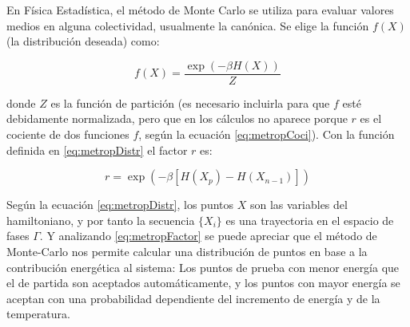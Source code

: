 \documentclass[11pt, a4paper]{article} %
\theoremstyle{named}
\begin{document}
En Física Estadística, el método de Monte Carlo se utiliza para evaluar valores medios en alguna colectividad, usualmente la canónica. Se elige la función $f(X)$ (la distribución deseada) como:

\begin{equation}\label{eq:metropDistr}
f(X) = \frac{\exp(-\beta H(X))}{Z}
\end{equation}

donde $Z$ es la función de partición (es necesario incluirla para que $f$ esté debidamente normalizada, pero que en los cálculos no aparece porque $r$ es el cociente de dos funciones $f$, según la ecuación \eqref{eq:metropCoci}). Con la función definida en \eqref{eq:metropDistr} el factor $r$ es:

\begin{equation}\label{eq:metropFactor}
r = \exp (-\beta [H(X_p) - H(X_{n-1})])
\end{equation}

Según la ecuación \eqref{eq:metropDistr}, los puntos $X$ son las variables del hamiltoniano, y por tanto la secuencia $\{X_i\}$ es una trayectoria en el espacio de fases $\Gamma$. Y analizando \eqref{eq:metropFactor} se puede apreciar que el método de Monte-Carlo nos permite calcular una distribución de puntos en base a la contribución energética al sistema: Los puntos de prueba con menor energía que el de partida son aceptados automáticamente, y los puntos con mayor energía se aceptan con una probabilidad dependiente del incremento de energía y de la temperatura.

\nocite{salcido}
\nocite{haro}
\nocite{gottwald}
\nocite{schroeder}
\nocite{pathria}
\nocite{huang}
\nocite{allen}
\nocite{krauth}
\nocite{greinier}
\nocite{koonin}
\nocite{wannier}
\nocite{reif}
\nocite{ashcroft}



\end{document}
